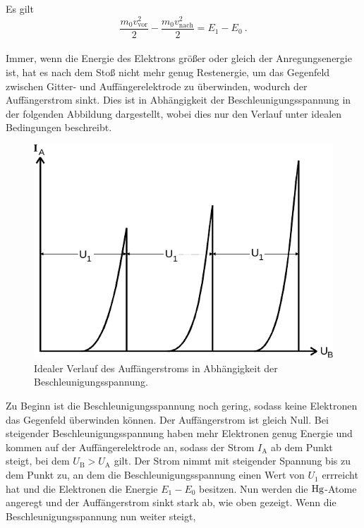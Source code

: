     Es gilt
    \begin{equation*}
        \frac{m_0 v^2_\text{vor}}{2} - \frac{m_0 v^2_\text{nach}}{2} = E_1 - E_0 \ .
    \end{equation*}
    \\
    Immer,
    wenn die Energie des Elektrons größer oder gleich der Anregungsenergie ist,
    hat es nach dem Stoß nicht mehr genug Restenergie,
    um das Gegenfeld zwischen Gitter- und Auffängerelektrode zu überwinden,
    wodurch der Auffängerstrom sinkt.
    Dies ist in Abhängigkeit der Beschleunigungsspannung in der folgenden Abbildung dargestellt,
    wobei dies nur den Verlauf unter idealen Bedingungen beschreibt.
    \begin{figure}[H]
        \centering
        \includegraphics[scale=0.8]{content/img/Abb_2.pdf}
        \caption{Idealer Verlauf des Auffängerstroms in Abhängigkeit der Beschleunigungsspannung.}
        \label{fig:idealer_verlauf}
    \end{figure}
    Zu Beginn ist die Beschleunigungsspannung noch gering, 
    sodass keine Elektronen das Gegenfeld überwinden können.
    Der Auffängerstrom ist gleich Null.
    Bei steigender Beschleunigungsspannung haben mehr Elektronen genug Energie und kommen auf der Auffängerelektrode an,
    sodass der Strom $I_\text{A}$ ab dem Punkt steigt,
    bei dem $U_\text{B} > U_\text{A}$ gilt.
    Der Strom nimmt mit steigender Spannung bis zu dem Punkt zu,
    an dem die Beschleunigungsspannung einen Wert von $U_1$ errreicht hat und die Elektronen die Energie $E_1-E_0$ besitzen.
    Nun werden die $\ce{Hg}$-Atome angeregt und der Auffängerstrom sinkt stark ab,
    wie oben gezeigt.
    Wenn die Beschleunigungsspannung nun weiter steigt,
